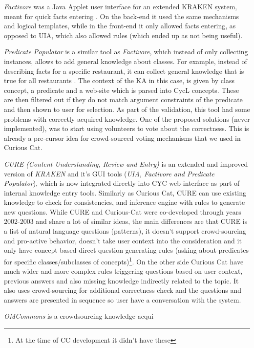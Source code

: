\emph{Factivore} was a Java Applet user interface for an extended KRAKEN system, meant for quick facts entering \parencite{Witbrock2005}. On the back-end it used the same mechanisms and logical templates, while in the front-end it only allowed facts entering, as opposed to UIA, which also allowed rules (which ended up as not being useful).

\emph{Predicate Populator} is a similar tool as \emph{Factivore}, which instead of only collecting instances, allows to add general knowledge about classes. For example, instead of describing facts for a specific restaurant, it can collect general knowledge that is true for all restaurants \parencite{Witbrock2005}. The context of the KA in this case, is given by class concept, a predicate and a web-site which is parsed into CycL concepts. These are then filtered out if they do not match argument constraints of the predicate and then shown to user for selection. As part of the validation, this tool had some problems with correctly acquired knowledge. One of the proposed solutions (never implemented), was to start using volunteers to vote about the correctness. This is already a pre-cursor idea for crowd-sourced voting mechanisms that we used in Curious Cat.

\emph{CURE (Content Understanding, Review and Entry)} is an extended and improved version of \emph{KRAKEN} and it's GUI tools (\emph{UIA, Factivore and Predicate Populator}), which is now integrated directly into CYC web-interface as part of internal knowledge entry tools. Similarly as Curious Cat, CURE can use existing knowledge to check for consistencies, and inference engine with rules to generate new questions. While CURE and Curious-Cat were co-developed through years 2002-2003 and share a lot of similar ideas, the main differences are that CURE is a list of natural language questions (patterns), it doesn't support crowd-sourcing and pro-active behavior, doesn't take user context into the consideration and it only have concept based direct question generating rules (asking about predicates for specific classes/subclasses of concepts)\footnote{At the time of CC development it didn't have these}. On the other side Curious Cat have much wider and more complex rules triggering questions based on user context, previous answers and also missing knowledge indirectly related to the topic. It also uses crowd-sourcing for additional correctness check and the questions and answers are presented in sequence so user have a conversation with the system.

\emph{OMCommons} is a crowdsourcing knowledge acqui

